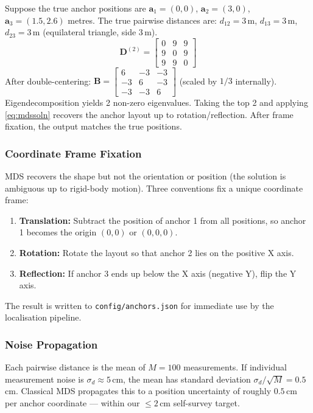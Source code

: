 \documentclass[11pt,a4paper]{article}
\newcommand{\vect}[1]{\bm{#1}}
\newcommand{\mat}[1]{\mathbf{#1}}
\begin{document}
\begin{exbox}
Suppose the true anchor positions are $\vect{a}_1 = (0,0)$, $\vect{a}_2 = (3,0)$, $\vect{a}_3 = (1.5,2.6)$ metres. The true pairwise distances are: $d_{12}=3$\,m, $d_{13}=3$\,m, $d_{23}=3$\,m (equilateral triangle, side 3\,m).
\[
\mat{D}^{(2)} = \begin{bmatrix} 0 & 9 & 9 \\ 9 & 0 & 9 \\ 9 & 9 & 0 \end{bmatrix}
\]
After double-centering: $\mat{B} = \begin{bmatrix} 6 & -3 & -3 \\ -3 & 6 & -3 \\ -3 & -3 & 6 \end{bmatrix}$ (scaled by $1/3$ internally). Eigendecomposition yields 2 non-zero eigenvalues. Taking the top 2 and applying \cref{eq:mdssoln} recovers the anchor layout up to rotation/reflection. After frame fixation, the output matches the true positions.
\end{exbox}

\subsubsection{Coordinate Frame Fixation}

MDS recovers the shape but not the orientation or position (the solution is ambiguous up to rigid-body motion). Three conventions fix a unique coordinate frame:
\begin{enumerate}[leftmargin=2em]
  \item \textbf{Translation:} Subtract the position of anchor 1 from all positions, so anchor 1 becomes the origin $(0,0)$ or $(0,0,0)$.
  \item \textbf{Rotation:} Rotate the layout so that anchor 2 lies on the positive X axis.
  \item \textbf{Reflection:} If anchor 3 ends up below the X axis (negative Y), flip the Y axis.
\end{enumerate}
The result is written to \texttt{config/anchors.json} for immediate use by the localisation pipeline.

\subsubsection{Noise Propagation}

Each pairwise distance is the mean of $M=100$ measurements. If individual measurement noise is $\sigma_d \approx 5$\,cm, the mean has standard deviation $\sigma_d/\sqrt{M} = 0.5$\,cm. Classical MDS propagates this to a position uncertainty of roughly $0.5$\,cm per anchor coordinate --- within our $\leq 2$\,cm self-survey target.
\end{document}

